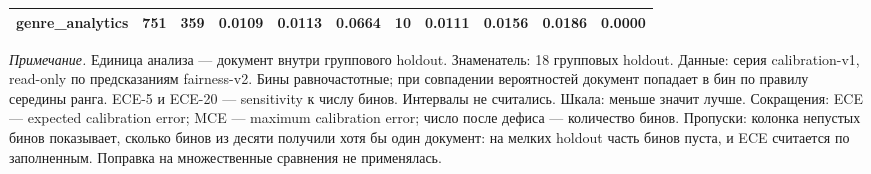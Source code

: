 \begin{table}
\begin{tabular}{lllllllllll}
genre\_analytics & 751 & 359 & 0.0109 & 0.0113 & 0.0664 & 10 & 0.0111 & 0.0156 & 0.0186 & 0.0000 \\
\bottomrule
\end{tabular}
\begin{minipage}{\linewidth}\footnotesize\vspace{2pt}
\textit{Примечание.} Единица анализа — документ внутри группового holdout. Знаменатель: 18 групповых holdout. Данные: серия calibration-v1, read-only по предсказаниям fairness-v2. Бины равночастотные; при совпадении вероятностей документ попадает в бин по правилу середины ранга. ECE-5 и ECE-20 — sensitivity к числу бинов. Интервалы не считались. Шкала: меньше значит лучше. Сокращения: ECE — expected calibration error; MCE — maximum calibration error; число после дефиса — количество бинов. Пропуски: колонка непустых бинов показывает, сколько бинов из десяти получили хотя бы один документ: на мелких holdout часть бинов пуста, и ECE считается по заполненным. Поправка на множественные сравнения не применялась.
\end{minipage}
\end{table}
